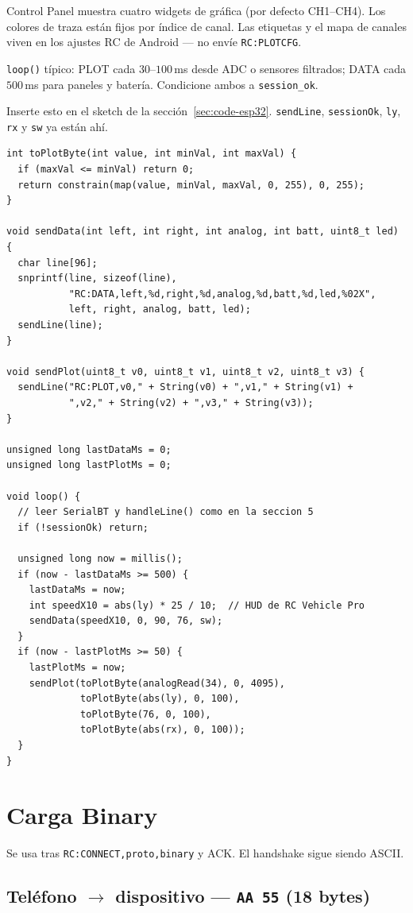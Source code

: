 \documentclass[12pt,a4paper]{article}
\begin{document}
Control Panel muestra cuatro widgets de gráfica (por defecto CH1--CH4).
Los colores de traza están fijos por índice de canal. Las etiquetas y el
mapa de canales viven en los ajustes RC de Android --- no envíe
\texttt{RC:PLOTCFG}.

\texttt{loop()} típico: PLOT cada $30$--$100$\,ms desde ADC o sensores
filtrados; DATA cada $500$\,ms para paneles y batería. Condicione ambos a
\texttt{session\_ok}.

Inserte esto en el sketch de la sección~\ref{sec:code-esp32}.
\texttt{sendLine}, \texttt{sessionOk}, \texttt{ly}, \texttt{rx} y
\texttt{sw} ya están ahí.

\begin{lstlisting}
int toPlotByte(int value, int minVal, int maxVal) {
  if (maxVal <= minVal) return 0;
  return constrain(map(value, minVal, maxVal, 0, 255), 0, 255);
}

void sendData(int left, int right, int analog, int batt, uint8_t led) {
  char line[96];
  snprintf(line, sizeof(line),
           "RC:DATA,left,%d,right,%d,analog,%d,batt,%d,led,%02X",
           left, right, analog, batt, led);
  sendLine(line);
}

void sendPlot(uint8_t v0, uint8_t v1, uint8_t v2, uint8_t v3) {
  sendLine("RC:PLOT,v0," + String(v0) + ",v1," + String(v1) +
           ",v2," + String(v2) + ",v3," + String(v3));
}

unsigned long lastDataMs = 0;
unsigned long lastPlotMs = 0;

void loop() {
  // leer SerialBT y handleLine() como en la seccion 5
  if (!sessionOk) return;

  unsigned long now = millis();
  if (now - lastDataMs >= 500) {
    lastDataMs = now;
    int speedX10 = abs(ly) * 25 / 10;  // HUD de RC Vehicle Pro
    sendData(speedX10, 0, 90, 76, sw);
  }
  if (now - lastPlotMs >= 50) {
    lastPlotMs = now;
    sendPlot(toPlotByte(analogRead(34), 0, 4095),
             toPlotByte(abs(ly), 0, 100),
             toPlotByte(76, 0, 100),
             toPlotByte(abs(rx), 0, 100));
  }
}
\end{lstlisting}

\Needspace{0.72\textheight}
\section{Carga Binary}
\label{sec:binary}

Se usa tras \texttt{RC:CONNECT,proto,binary} y ACK.
El handshake sigue siendo ASCII.

\subsection{Teléfono $\rightarrow$ dispositivo --- \texttt{AA 55} (18 bytes)}
\end{document}
